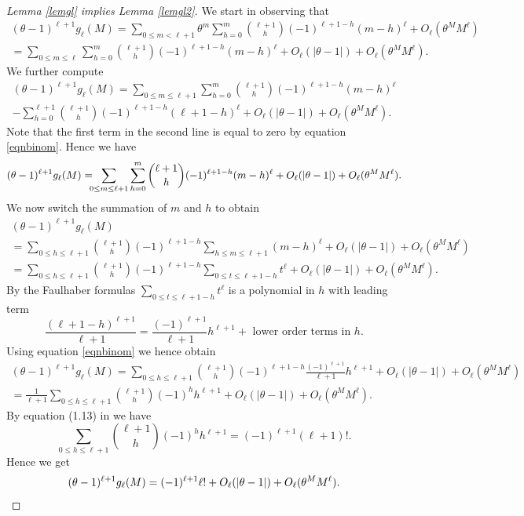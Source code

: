 \documentclass[JEP,XML,SOM,Unicode,published]{cedram}
\let\tet\theta
\theoremstyle{definition}
\numberwithin{theorem}{section}
\begin{document}
\begin{proof}[Lemma \ref{lemgl} implies Lemma \ref{lemgl2}]
We start in observing that
\begin{multline*}
(\tet -1)^{\ell+1}g_\ell(M)= \sum_{0\leq m<\ell+1}\tet^m \sum_{h=0}^m \binom{\ell+1}{h}(-1)^{\ell+1-h}(m-h)^\ell
+O_\ell (\tet^M M^\ell)\\
= \sum_{0\leq m\leq \ell} \sum_{h=0}^m \binom{\ell+1}{h}(-1)^{\ell+1-h}(m-h)^\ell 
+O_\ell(|\tet-1|)+O_{\ell}(\tet^M M^{\ell}).
\end{multline*}
We further compute
\begin{multline*}
(\tet -1)^{\ell+1}g_\ell(M)= \sum_{0\leq m\leq \ell+1} \sum_{h=0}^m \binom{\ell+1}{h}(-1)^{\ell+1-h}(m-h)^\ell \\
- \sum_{h=0}^{\ell+1} \binom{\ell+1}{h}(-1)^{\ell+1-h}(\ell+1-h)^\ell +O_\ell(|\tet-1|)+O_\ell (\tet^M M^\ell).
\end{multline*}
Note that the first term in the second line is equal to zero by equation \eqref{eqnbinom}. Hence we have
\[
(\tet -1)^{\ell+1}g_\ell(M)=\hspace*{-2mm} \sum_{0\leq m\leq \ell+1} \sum_{h=0}^m \binom{\ell+1}{h}(-1)^{\ell+1-h}(m-h)^\ell
+O_\ell(|\tet-1|)+O_\ell (\tet^M M^\ell).
\]
We now switch the summation of $m$ and $h$ to obtain
\begin{multline*}
(\tet -1)^{\ell+1}g_\ell(M)\\
= \sum_{0\leq h\leq \ell+1} \binom{\ell+1}{h}(-1)^{\ell+1-h}\sum_{h\leq m\leq \ell+1} (m-h)^\ell 
+O_\ell(|\tet-1|)+O_\ell (\tet^M M^\ell)\\
= \sum_{0\leq h\leq \ell+1} \binom{\ell+1}{h}(-1)^{\ell+1-h}\sum_{0\leq t\leq \ell+1-h} t^\ell +O_\ell(|\tet-1|)+O_\ell(\tet^M M^\ell).
\end{multline*}
By the Faulhaber formulas $\sum_{0\leq t\leq \ell+1-h} t^\ell$ is a polynomial in $h$ with leading term
\[
\frac{(\ell+1-h)^{\ell+1}}{\ell+1} = \frac{(-1)^{\ell+1}}{\ell+1}h^{\ell+1} + \mbox{ lower order terms in } h.
\]
Using equation \eqref{eqnbinom} we hence obtain
\begin{multline*}
(\tet -1)^{\ell+1}g_\ell(M)= \sum_{0\leq h\leq \ell+1} \binom{\ell+1}{h}(-1)^{\ell+1-h} \frac{(-1)^{\ell+1}}{\ell+1}h^{\ell+1}+O_\ell(|\tet-1|)+O_\ell (\tet^M M^\ell)\\
= \frac{1}{\ell+1}\sum_{0\leq h\leq \ell+1} \binom{\ell+1}{h}(-1)^{h} h^{\ell+1}+O_\ell(|\tet-1|)+O_\ell(\tet^M M^\ell).
\end{multline*}
By equation (1.13) in \cite{Gould} we have
\[
\sum_{0\leq h\leq \ell+1} \binom{\ell+1}{h}(-1)^{h} h^{\ell+1} = (-1)^{\ell+1} (\ell+1)!.
\]
Hence we get
\[
(\tet -1)^{\ell+1}g_\ell(M)=(-1)^{\ell+1} \ell! +O_\ell(|\tet-1|)+O_\ell (\tet^M M^\ell). \qedhere
\]
\end{proof}
\end{document}
